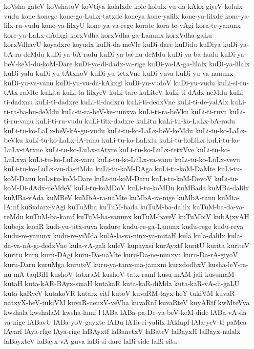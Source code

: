 {koVsha-gateV
koVshatoV
koVtiya
kolalxde
kole
kolulx-vu-da-kAkx-giyeV
kolulx-vudu
kone
konege
kone-go-LuLx-tatxde
koneya
kone-yalilx
kone-ya-lilxde
kone-ya-lilx-ru-vudu
kone-ya-lilxyU
kone-ya-va-rege
korate
kora-te-yAgi
kora-te-yanunx
kore-yu-LaLx-dAdxgi
korxVdha
korxVdha-ga-Lanunx
korxVdha-gaLu
korxVdhavU
koyadxre
koyudx
kuDi-da-meVle
kuDi-dare
kuDidu
kuDiya
kuDi-ya-bA-ra-deMdu
kuDi-ya-bA-radu
kuDi-ya-ba-hu-deMdu
kuDi-ya-ba-hudu
kuDi-ya-beV-keM-du-koM-Dare
kuDi-ya-di-dadx-va-rige
kuDi-ya-lA-ga-lilalx
kuDi-ya-lilalx
kuDi-yalu
kuDi-yu-tAtxnoV
kuDi-yu-tetxVne
kuDi-yuva
kuDi-yu-va-nanunx
kuDi-yu-va-vanu
kuDi-yu-vu-da-kAkxgi
kuDi-yu-vudoV
kuDi-yu-vudu
kuLi-si-ru-tAtx-raMte
kuLita
kuLi-ta-lilxyeV
kuLi-tare
kuLiteV
kuLi-ti-dAdx-neMdu
kuLi-ti-dadxnu
kuLi-ti-dadxre
kuLi-ti-dadxru
kuLi-ti-dedxVne
kuLi-ti-de-yalAlx
kuLi-ti-ra-ba-hu-deMdu
kuLi-ti-ra-beV-ke-nunxva
kuLi-ti-ra-beVku
kuLi-ti-ruva
kuLi-ti-ru-vanu
kuLi-ti-ru-vudu
kuLi-titx-dadxre
kuLitu
kuLi-tu-ko-LaLx-bA-radu
kuLi-tu-ko-LaLx-beV-kA-gu-vudu
kuLi-tu-ko-LaLx-beV-keMdu
kuLi-tu-ko-LaLx-beVku
kuLi-tu-ko-LaLx-lA-ranu
kuLi-tu-ko-LaLxlu
kuLi-tu-koLiLx
kuLi-tu-ko-LuLx-tAtxne
kuLi-tu-ko-LuLx-tAtxre
kuLi-tu-ko-LuLx-tetxVve
kuLi-tu-ko-LuLxva
kuLi-tu-ko-LuLx-vanu
kuLi-tu-ko-LuLx-va-vanu
kuLi-tu-ko-LuLx-vevu
kuLi-tu-ko-LuLx-vu-da-riMda
kuLi-tu-koM-DAga
kuLi-tu-koM-DaMte
kuLi-tu-koM-Danu
kuLi-tu-koM-Dare
kuLi-tu-koM-Daru
kuLi-tu-koM-DevoV
kuLi-tu-koM-Di-dAdx-neMdeV
kuLi-tu-koMDoV
kuLi-tu-koMDu
kuMBada
kuMBa-dalilx
kuMBa-vAda
kuMBeV
kuMbA-ra-naMte
kuMbA-ra-nige
kuMbA-ranu
kuMta-lAmf
kuSxdarx-vAgi
kuTuMba
kuTuM-bada
kuTuM-ba-dalilx
kuTuM-ba-da-va-reMdu
kuTuM-ba-kamf
kuTuM-ba-vanunx
kuTuM-baveV
kuTuMbiV
kubAjxyAH
kubejx
kuciR
kudi-yu-titx-ruva
kudure
kudu-re-ga-Lanunx
kudu-rege
kudu-reya
kudu-re-yanunx
kudu-re-yiMda
kulA-la-va-ninx-ya-mitaH
kula
kula-dalilx
kula-da-va-nA-gi-dedxVne
kula-vA-gali
kuleV
kupayxsi
kurAyxtf
kuritU
kurita
kuriteV
kuritu
kuru
kuru-DAgi
kuru-Da-naMte
kuru-Da-ne-nunxva
kuru-Da-rA-giyoV
kuru-Daru
kuruMga
kuruteV
kuru-ya-tanx-ma-jamxni
kurxdodhxV
kusha-leY-ra-nu-mA-taqBiH
kushoV-tatxraM
kushoV-tatx-ramf
kusu-mAM-jali
kusumaM
kutaH
kuta-kAR-BAyx-sinaH
kutakaR
kuta-kaR-diMda
kuta-kaR-vA-di-gaLU
kuta-kaRveV
kutakoVR
kutarx-citf
kutoV
kuvaRM-tayx-heY-tukiVM
kuvaR-natxyX-heV-tukiVM
kuvaR-nenxV-veVha
kuvaRnf
kuvaRteV
kuyARtf
kwMteVya
kwshala
kwshalaM
kwsha-lamf
l
lABa
lABa-pa-De-ya-beV-keM-dide
lABa-vA-da-va-nige
lABavU
lABa-yoV-gayxte
lADu
lATa-ri-yalilx
lAkfapf
lAla-yeV-tf-paMca
lAyarf
lAya-rfge
lAya-rige
laBAyxtf
laBanetxV
laBateV
laBayxH
laBayx-nalalx
laBayxteV
laBayx-vA-guva
laBi-si-dare
laBi-side
laBi-situ
}
